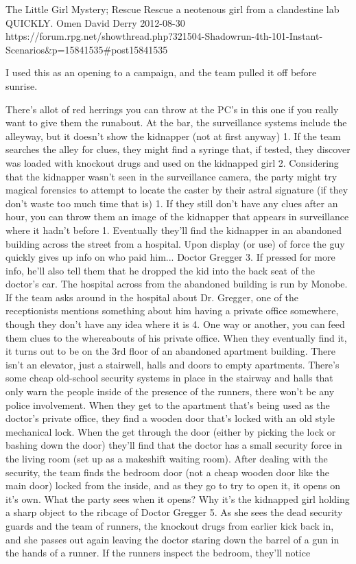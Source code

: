 \begin{scenario}{The Little Girl}
	{Mystery; Rescue}
	{Rescue a neotenous girl from a clandestine lab QUICKLY.}
	{Omen David Derry}
	{2012-08-30}
	{https://forum.rpg.net/showthread.php?321504-Shadowrun-4th-101-Instant-Scenarios\&p=15841535\#post15841535}

 I used this as an opening to a campaign, and the team pulled it off before sunrise.


\synopsis  There's allot of red herrings you can throw at the PC's in this one if you really want to give them the runabout. At the bar, the surveillance systems include the alleyway, but it doesn't show the kidnapper (not at first anyway) 1. If the team searches the alley for clues, they might find a syringe that, if tested, they discover was loaded with knockout drugs and used on the kidnapped girl 2. Considering that the kidnapper wasn't seen in the surveillance camera, the party might try magical forensics to attempt to locate the caster by their astral signature (if they don't waste too much time that is) 1. If they still don't have any clues after an hour, you can throw them an image of the kidnapper that appears in surveillance where it hadn't before 1. Eventually they'll find the kidnapper in an abandoned building across the street from a hospital. Upon display (or use) of force the guy quickly gives up info on who paid him... Doctor Gregger 3. If pressed for more info, he'll also tell them that he dropped the kid into the back seat of the doctor's car. The hospital across from the abandoned building is run by Monobe. If the team asks around in the hospital about Dr. Gregger, one of the receptionists mentions something about him having a private office somewhere, though they don't have any idea where it is 4. One way or another, you can feed them clues to the whereabouts of his private office. When they eventually find it, it turns out to be on the 3rd floor of an abandoned apartment building. There isn't an elevator, just a stairwell, halls and doors to empty apartments. There's some cheap old-school security systems in place in the stairway and halls that only warn the people inside of the presence of the runners, there won't be any police involvement. When they get to the apartment that's being used as the doctor's private office, they find a wooden door that's locked with an old style mechanical lock. When the get through the door (either by picking the lock or bashing down the door) they'll find that the doctor has a small security force in the living room (set up as a makeshift waiting room). After dealing with the security, the team finds the bedroom door (not a cheap wooden door like the main door) locked from the inside, and as they go to try to open it, it opens on it's own. What the party sees when it opens? Why it's the kidnapped girl holding a sharp object to the ribcage of Doctor Gregger 5. As she sees the dead security guards and the team of runners, the knockout drugs from earlier kick back in, and she passes out again leaving the doctor staring down the barrel of a gun in the hands of a runner. If the runners inspect the bedroom, they'll notice 
\end{scenario}

